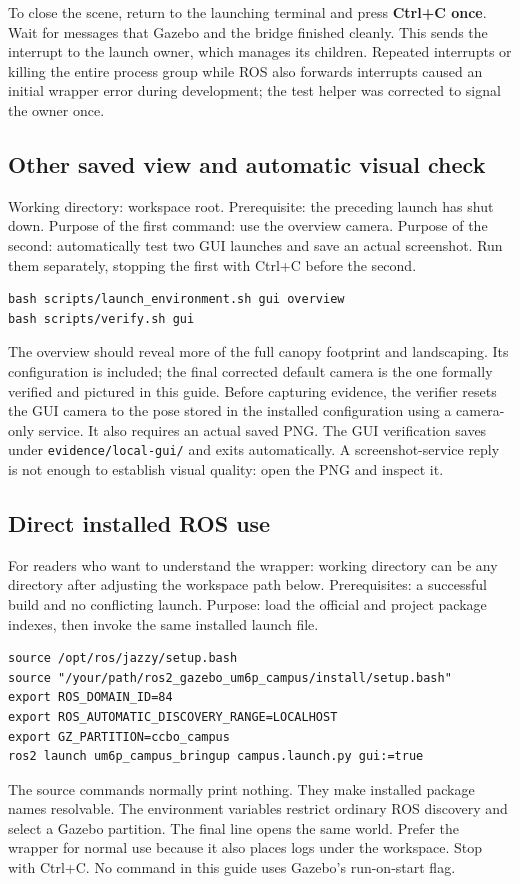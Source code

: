To close the scene, return to the launching terminal and press \textbf{Ctrl+C once}. Wait for messages that Gazebo and the bridge finished cleanly. This sends the interrupt to the launch owner, which manages its children. Repeated interrupts or killing the entire process group while ROS also forwards interrupts caused an initial wrapper error during development; the test helper was corrected to signal the owner once.

\subsection{Other saved view and automatic visual check}
Working directory: workspace root. Prerequisite: the preceding launch has shut down. Purpose of the first command: use the overview camera. Purpose of the second: automatically test two GUI launches and save an actual screenshot. Run them separately, stopping the first with Ctrl+C before the second.
\begin{lstlisting}
bash scripts/launch_environment.sh gui overview
bash scripts/verify.sh gui
\end{lstlisting}
The overview should reveal more of the full canopy footprint and landscaping. Its configuration is included; the final corrected default camera is the one formally verified and pictured in this guide. Before capturing evidence, the verifier resets the GUI camera to the pose stored in the installed configuration using a camera-only service. It also requires an actual saved PNG. The GUI verification saves under \texttt{evidence/local-gui/} and exits automatically. A screenshot-service reply is not enough to establish visual quality: open the PNG and inspect it.

\subsection{Direct installed ROS use}
For readers who want to understand the wrapper: working directory can be any directory after adjusting the workspace path below. Prerequisites: a successful build and no conflicting launch. Purpose: load the official and project package indexes, then invoke the same installed launch file.
\begin{lstlisting}
source /opt/ros/jazzy/setup.bash
source "/your/path/ros2_gazebo_um6p_campus/install/setup.bash"
export ROS_DOMAIN_ID=84
export ROS_AUTOMATIC_DISCOVERY_RANGE=LOCALHOST
export GZ_PARTITION=ccbo_campus
ros2 launch um6p_campus_bringup campus.launch.py gui:=true
\end{lstlisting}
The source commands normally print nothing. They make installed package names resolvable. The environment variables restrict ordinary ROS discovery and select a Gazebo partition. The final line opens the same world. Prefer the wrapper for normal use because it also places logs under the workspace. Stop with Ctrl+C. No command in this guide uses Gazebo's run-on-start flag.

